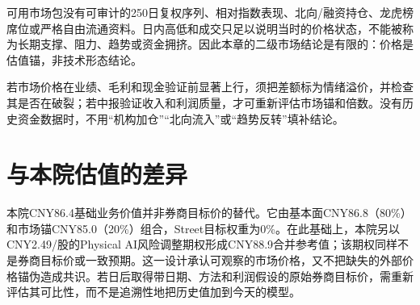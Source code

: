 可用市场包没有可审计的250日复权序列、相对指数表现、北向/融资持仓、龙虎榜席位或严格自由流通资料。日内高低和成交只足以说明当时的价格状态，不能被称为长期支撑、阻力、趋势或资金拥挤。因此本章的二级市场结论是有限的：价格是估值锚，非技术形态结论。

\begin{keyinsight}[情绪溢价的正确处置]
若市场价格在业绩、毛利和现金验证前显著上行，须把差额标为情绪溢价，并检查其是否在破裂；若中报验证收入和利润质量，才可重新评估市场锚和倍数。没有历史资金数据时，不用“机构加仓”“北向流入”或“趋势反转”填补结论。
\end{keyinsight}

\section{与本院估值的差异}

本院CNY86.4基础业务价值并非券商目标价的替代。它由基本面CNY86.8（80\%）和市场锚CNY85.0（20\%）组合，Street目标权重为0\%。在此基础上，本院另以CNY2.49/股的Physical AI风险调整期权形成CNY88.9合并参考值；该期权同样不是券商目标价或一致预期。这一设计承认可观察的市场价格，又不把缺失的外部价格锚伪造成共识。若日后取得带日期、方法和利润假设的原始券商目标价，需重新评估其可比性，而不是追溯性地把历史值加到今天的模型。
